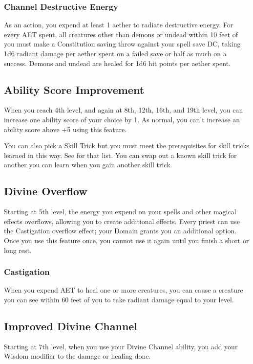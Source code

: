 \subsubsection{Channel Destructive Energy}
As an action, you expend at least 1 aether to radiate destructive energy. For every AET spent, all creatures other than demons or undead within 10 feet of you must make a Constitution saving throw against your spell save DC, taking 1d6 radiant damage per aether spent on a failed save or half as much on a success. Demons and undead are healed for 1d6 hit points per aether spent.

\subsection{Ability Score Improvement}

When you reach 4th level, and again at 8th, 12th, 16th, and 19th level, you can increase one ability score of your choice by 1.  As normal, you can't increase an ability score above +5 using this feature.

You can also pick a Skill Trick but you must meet the prerequisites for skill tricks learned in this way. See  for that list. You can swap out a known skill trick for another you can learn when you gain another skill trick.

\subsection{Divine Overflow}

Starting at 5th level, the energy you expend on your spells and other magical effects overflows, allowing you to create additional effects. Every priest can use the Castigation overflow effect; your Domain grants you an additional option. Once you use this feature once, you cannot use it again until you finish a short or long rest.

\subsubsection{Castigation}
When you expend AET to heal one or more creatures, you can cause a creature you can see within 60 feet of you to take radiant damage equal to your level.

\subsection{Improved Divine Channel}
Starting at 7th level, when you use your Divine Channel ability, you add your Wisdom modifier to the damage or healing done.

